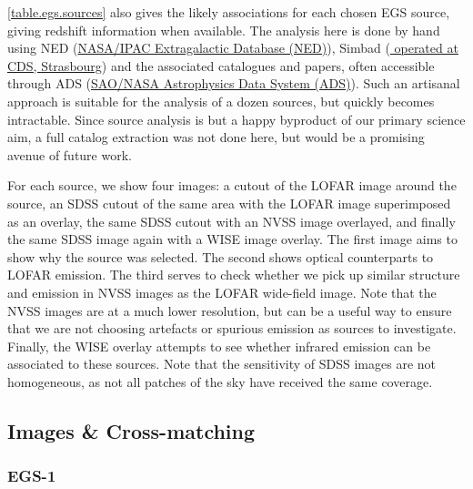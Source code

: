 \pg
\cref{table.egs.sources} also gives the likely associations for each chosen EGS source, giving redshift information when available. The analysis here is done by hand using NED (\href{https://ned.ipac.caltech.edu/}{NASA/IPAC Extragalactic Database (NED)}), Simbad (\href{http://simbad.u-strasbg.fr/simbad/}{
operated at CDS, Strasbourg}) and the associated catalogues and papers, often accessible through ADS (\href{http://adsabs.harvard.edu/}{SAO/NASA Astrophysics Data System (ADS)}). Such an artisanal approach is suitable for the analysis of a dozen sources, but quickly becomes intractable. %
Since source analysis is but a happy byproduct of our primary science aim, a full catalog extraction was not done here, but would be a promising avenue of future work.

\pg
For each source, we show four images: a cutout of the LOFAR image around the source, an SDSS cutout of the same area with the LOFAR image superimposed as an overlay, the same SDSS cutout with an NVSS image overlayed, and finally the same SDSS image again with a WISE image overlay. The first image aims to show why the source was selected. The second shows optical counterparts to LOFAR emission. The third serves to check whether we pick up similar structure and emission in NVSS images as the LOFAR wide-field image. Note that the NVSS images are at a much lower resolution, but can be a useful way to ensure that we are not choosing artefacts or spurious emission as sources to investigate. Finally, the WISE overlay attempts to see whether infrared emission can be associated to these sources. Note that the sensitivity of SDSS images are not homogeneous, as not all patches of the sky have received the same coverage. 

\subsection{Images \& Cross-matching}

\clearpage
\subsubsection{EGS-1}



